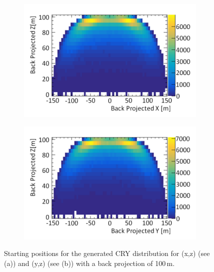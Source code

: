 \begin{figure}[!h]
\centering
\begin{subfigure}{.5\textwidth}
  \centering
  \includegraphics[width=\linewidth]{Chapter4/Figs/Raster/CryPlots/BackProjectionXZMedText.png}
  \captionsetup{width=.9\linewidth}
  \caption{}
  \label{subFig:BackProjectionXZ}
\end{subfigure}%
\begin{subfigure}{.5\textwidth}
  \centering
  \includegraphics[width=\linewidth]{Chapter4/Figs/Raster/CryPlots/BackProjectionYZMedText.png}
  \captionsetup{width=.9\linewidth}
  \caption{}
  \label{subFig:BackProjectionYZ}
\end{subfigure}
\caption[Starting positions for the generated CRY distribution.]{Starting positions for the generated CRY distribution for (x,z) (see (a)) and (y,z) (see (b)) with a back projection of 100\,m.}
\label{fig:BackProjection_XZ_YZ}
\end{figure}


